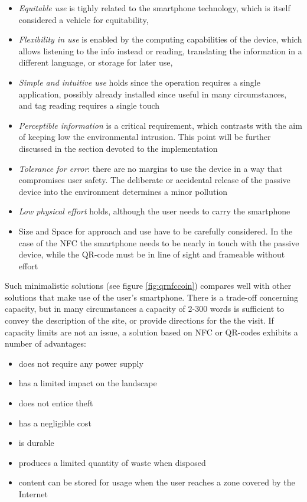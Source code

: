\documentclass[sustainability,article,submit,pdftex,moreauthors]{Definitions/mdpi}
\begin{document}

\begin{itemize}
	\item {\em Equitable use} is tighly related to the smartphone technology, which is itself considered a vehicle for equitability,
	\item {\em Flexibility in use} is enabled by the computing capabilities of the device, which allows listening to the info instead or reading, translating the information in a different language, or storage for later use,
	\item {\em Simple and intuitive use} holds since the operation requires a single application, possibly already installed since useful in many circumstances, and tag reading requires a single touch
	\item{\em Perceptible information} is a critical requirement, which contrasts with the aim of keeping low the environmental intrusion. This point will be further discussed in the section devoted to the implementation
	\item{\em Tolerance for error}: there are no margins to use the device in a way that compromises user safety. The deliberate or accidental release of the passive device into the environment determines a minor pollution
	\item{\em Low physical effort} holds, although the user needs to carry the smartphone
	\item{Size and Space for approach and use} have to be carefully considered. In the case of the NFC the smartphone needs to be nearly in touch with the passive device, while the QR-code must be in line of sight and frameable without effort
\end{itemize}

Such minimalistic solutions (see figure \ref{fig:qrnfccoin}) compares well with other solutions that make use of the user's smartphone. There is a trade-off concerning capacity, but in many circumstances a capacity of 2-300 words is sufficient to convey the description of the site, or provide directions for the the visit. If capacity limits are not an issue, a solution based on NFC or QR-codes exhibits a number of advantages:
\begin{itemize} 
\item does not require any power supply
\item has a limited impact on the landscape
\item does not entice theft
\item has a negligible cost
\item is durable
\item produces a limited quantity of waste when disposed
\item content can be stored for usage when the user reaches a zone covered by the Internet
\end{itemize}
\end{document}
